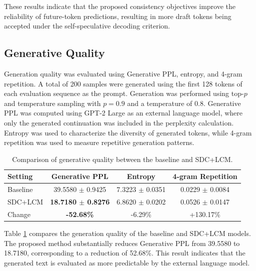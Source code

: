 These results indicate that the proposed consistency objectives improve
the reliability of future-token predictions, resulting in more draft tokens
being accepted under the self-speculative decoding criterion.

\subsection{Generative Quality}\label{subsec:generative_quality}

Generation quality was evaluated using Generative PPL, entropy, and
4-gram repetition. A total of 200 samples were generated using the first
128 tokens of each evaluation sequence as the prompt. Generation was
performed using top-$p$ and temperature sampling with $p=0.9$ and a
temperature of 0.8. Generative PPL was computed using GPT-2 Large as an
external language model, where only the generated continuation was included
in the perplexity calculation. Entropy was used to characterize the
diversity of generated tokens, while 4-gram repetition was used to measure
repetitive generation patterns.

\begin{table}[!htbp]
    \centering
    \caption{Comparison of generative quality between the baseline and SDC+LCM.}
    \label{tab:generative_quality}
    \begin{tabular}{lccc}
        \toprule[1.25pt]
        Setting
        & Generative PPL
        & Entropy
        & 4-gram Repetition \\
        \midrule

        Baseline
        & 39.5580 $\pm$ 0.9425
        & 7.3223 $\pm$ 0.0351
        & 0.0229 $\pm$ 0.0084 \\

        SDC+LCM
        & \textbf{18.7180 $\pm$ 0.8276}
        & 6.8620 $\pm$ 0.0202
        & 0.0526 $\pm$ 0.0147 \\

        Change
        & \textbf{-52.68\%}
        & -6.29\%
        & +130.17\% \\
        \bottomrule[1.25pt]
    \end{tabular}
\end{table}

Table \ref{tab:generative_quality} compares the generation quality of the
baseline and SDC+LCM models. The proposed method substantially reduces
Generative PPL from 39.5580 to 18.7180, corresponding to a reduction of
52.68\%. This result indicates that the generated text is evaluated as
more predictable by the external language model.

